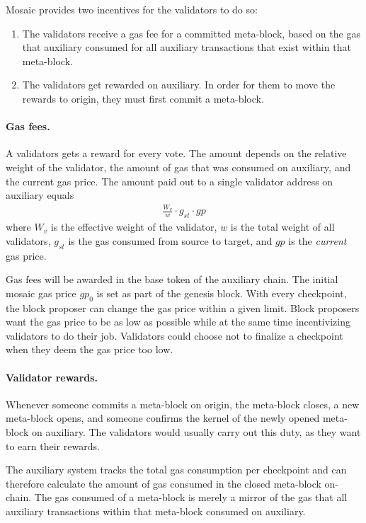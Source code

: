 \documentclass[12pt,a4paper]{article}
\begin{document}
Mosaic provides two incentives for the validators to do so:

\begin{enumerate}
	\item The validators receive a gas fee for a committed meta-block, based on the gas that auxiliary consumed for all auxiliary transactions that exist within that meta-block.
	\item The validators get rewarded on auxiliary. In order for them to move the rewards to origin, they must first commit a meta-block.
\end{enumerate}

\paragraph{Gas fees.}
A validators gets a reward for every vote.
The amount depends on the relative weight of the validator, the amount of gas that was consumed on auxiliary, and the current gas price.
The amount paid out to a single validator address on auxiliary equals
\begin{align*}
    \frac{W_v}{w} \cdot g_{st} \cdot gp
\end{align*}
where $W_v$ is the effective weight of the validator, $w$ is the total weight of all validators, $g_{st}$ is the gas consumed from source to target, and $gp$ is the \emph{current} gas price.

Gas fees will be awarded in the base token of the auxiliary chain.
The initial mosaic gas price $gp_0$ is set as part of the genesis block.
With every checkpoint, the block proposer can change the gas price within a given limit.
Block proposers want the gas price to be as low as possible while at the same time incentivizing validators to do their job.
Validators could choose not to finalize a checkpoint when they deem the gas price too low.

\paragraph{Validator rewards.}
Whenever someone commits a meta-block on origin, the meta-block closes, a new meta-block opens, and someone confirms the kernel of the newly opened meta-block on auxiliary.
The validators would usually carry out this duty, as they want to earn their rewards.

The auxiliary system tracks the total gas consumption per checkpoint and can therefore calculate the amount of gas consumed in the closed meta-block on-chain.
The gas consumed of a meta-block is merely a mirror of the gas that all auxiliary transactions within that meta-block consumed on auxiliary.
\end{document}
